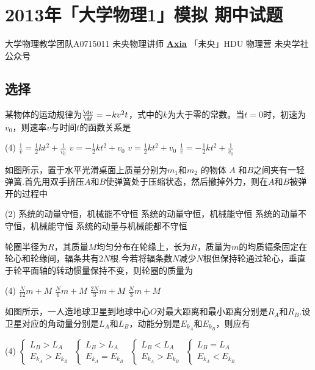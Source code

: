 \chapter{2013年「大学物理1」模拟 期中试题}
\date{2013年6月??日}{大学物理教学团队}{A0715011}
{未央物理讲师 \href{https://qm.qq.com/q/UPbGudx8cK}{\textbf{Axia}}}
{}{「未央」HDU 物理营}
{}{未央学社公众号}
\section{选择}
\begin{choice}[A]{}
某物体的运动规律为$\frac{\d v}{\d t}=-kv^2t$，式中的$k$为大于零的常数。当$t=0$时，初速为$v_0$，则速率$v$与时间$t$的函数关系是
\begin{tasks}(4)
    \task $\frac{1}{v}=\frac{1}{2}kt^2+\frac{1}{v_0}$
    \task $v=-\frac{1}{2}kt^2+v_0$
    \task $v=\frac{1}{2}kt^2+v_0$
    \task $\frac{1}{v}=-\frac{1}{2}kt^2+\frac{1}{v_0}$
\end{tasks}
\end{choice}
\begin{choice}[B]{}
如图所示，置于水平光滑桌面上质量分别为$m_1$和$m_2$ 的物体 $A$ 和$B$之间夹有一轻弹簧.首先用双手挤压$A$和$B$使弹簧处于压缩状态，然后撤掉外力，则在$A$和$B$被弹开的过程中
\begin{tasks}(2)
    \task 系统的动量守恒，机械能不守恒
    \task 系统的动量守恒，机械能守恒
    \task 系统的动量不守恒，机械能守恒
    \task 系统的动量与机械能都不守恒
\end{tasks}
\end{choice}
\begin{choice}[D]{}
    轮圈半径为$R$，其质量$M$均匀分布在轮缘上，长为$R$，质量为$m$的均质辐条固定在轮心和轮缘间，辐条共有$2N$根.今若将辐条数$N$减少$N$根但保持轮通过轮心，垂直于轮平面轴的转动惯量保持不变，则轮圈的质量为
\begin{tasks}(4)
    \task $\frac{N}{12}m+M$
    \task $\frac{N}{6}m+M$
    \task $\frac{2N}{3}m+M$
    \task $\frac{N}{3}m+M$
\end{tasks}
\end{choice}
\begin{choice}[D]{}
如图所示，一人造地球卫星到地球中心$O$对最大距离和最小距离分别是$R_A$和$R_B$.设卫星对应的角动量分别是$L_A$和$L_B$，动能分别是$E_{k_A}$和$E_{k_B}$，则应有
\begin{tasks}(4)
    \task $\begin{cases}L_B>L_A\\E_{k_A}>E_{k_B}\end{cases}$
    \task $\begin{cases}L_B>L_A\\E_{k_A}=E_{k_B}\end{cases}$
    \task $\begin{cases}L_B<L_A\\E_{k_A}>E_{k_B}\end{cases}$
    \task $\begin{cases}L_B=L_A\\E_{k_A}<E_{k_B}\end{cases}$
\end{tasks}
\end{choice}